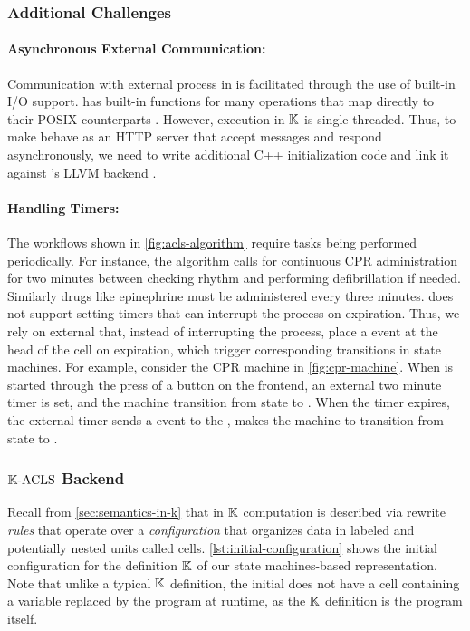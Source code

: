 \subsubsection{Additional Challenges}

\paragraph{Asynchronous External Communication:}
Communication with external process in \K{} is facilitated
through the use of built-in I/O support. \K has built-in
functions for many operations that map directly to their
POSIX counterparts \cite{KFrameworkIOUrl}. However,
execution in $\mathbb{K}$ is single-threaded. Thus, to make \K{}
behave as an HTTP \cite{HTTPUrl} server that accept messages and respond asynchronously,
we need to write additional C++ initialization code and link it against
\K's LLVM backend \cite{KFrameworkBackendsUrl}.

\paragraph{Handling Timers:}
The \ACLS{} workflows shown in \autoref{fig:acls-algorithm} require
tasks being performed periodically. For instance, the algorithm
calls for continuous CPR administration for two minutes
between checking rhythm and performing defibrillation if needed.
Similarly drugs like epinephrine must be administered every three minutes.
\K{} does not support setting timers that can interrupt the \K{} process
on expiration. Thus, we rely on external  that, instead
of interrupting the \K{} process, place a  event
at the head of the  cell on expiration, which
trigger corresponding transitions in state machines. For example,
consider the CPR machine in \autoref{fig:cpr-machine}. When
\CPR{} is started through the press of a button on the frontend,
an external two minute timer is set, and the machine
transition from state  to .
When the timer expires, the external timer sends a 
event to the \K{}, makes the \CPR{} machine to transition from
state  to .

\subsubsection{$\mathbb{K}{}\text{-ACLS}{}$ Backend}
Recall from \autoref{sec:semantics-in-k} that in $\mathbb{K}$ computation
is described via rewrite \emph{rules} that operate over a \emph{configuration}
that organizes data in labeled and potentially nested units called cells.
\autoref{lst:initial-configuration} shows the initial configuration for
the definition $\mathbb{K}$ of our state machines-based representation.
Note that unlike a typical $\mathbb{K}{}$ definition, the initial 
does not have a  cell containing a  variable
replaced by the program \AST{} at runtime, as the $\mathbb{K}$ definition is the
program itself.

